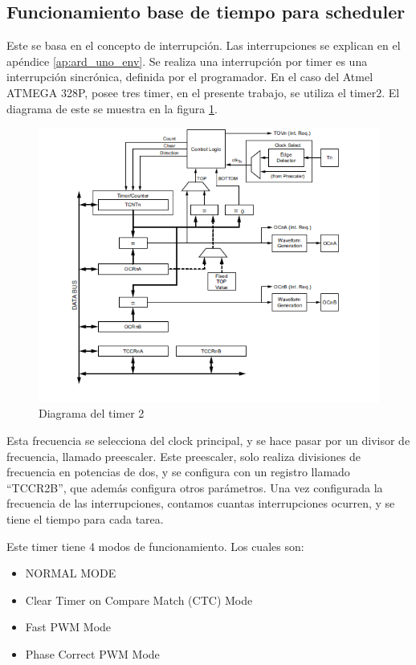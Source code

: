 \subsection{Funcionamiento base de tiempo para scheduler}

Este se basa en el concepto de interrupción. Las interrupciones se explican en el apéndice \ref{ap:ard_uno_env}. Se realiza una interrupción por timer es una interrupción sincrónica, definida por el programador. En el caso del Atmel ATMEGA 328P, posee tres timer, en el presente trabajo, se utiliza el timer2. El diagrama de este se muestra en la figura \ref{fig:timer_2}. 

\begin{figure}[ht]
	\includegraphics{timer_2}
	\caption{Diagrama del timer 2 }
	\label{fig:timer_2}
\end{figure}


Esta frecuencia se selecciona del clock principal, y se hace pasar por un divisor de frecuencia, llamado preescaler. Este preescaler, solo realiza divisiones de frecuencia en potencias de dos, y se configura con un registro llamado ``TCCR2B'', que además configura otros parámetros. Una vez configurada la frecuencia de las interrupciones, contamos cuantas interrupciones ocurren, y se tiene el tiempo para cada tarea. 

Este timer tiene 4 modos de funcionamiento. Los cuales son:  

\begin{itemize}
	\item NORMAL MODE 
	\item Clear Timer on Compare Match (CTC) Mode
	\item Fast PWM Mode 
	\item Phase Correct PWM Mode
\end{itemize}

